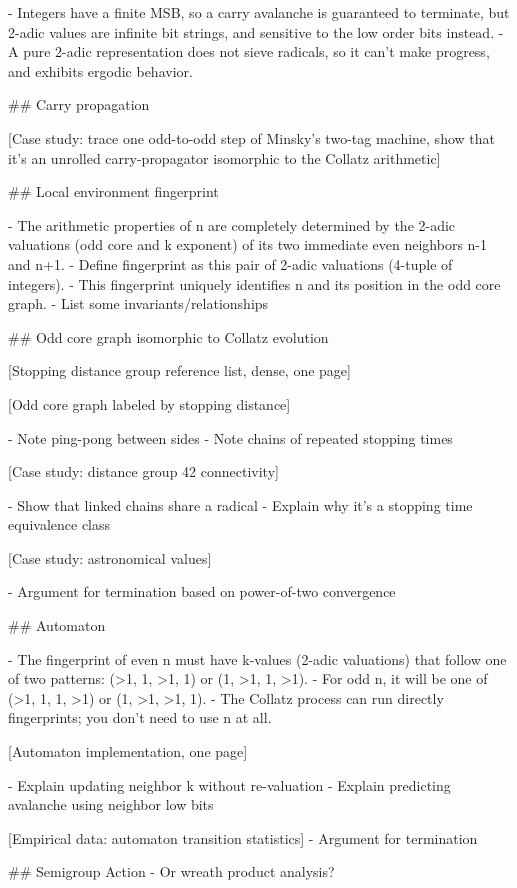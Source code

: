 \documentclass[12pt]{article}
\theoremstyle{plain}
\theoremstyle{definition}
\begin{document}
- Integers have a finite MSB, so a carry avalanche is guaranteed to terminate, but 2-adic values are infinite bit strings, and sensitive to the low order bits instead. 
- A pure 2-adic representation does not sieve radicals, so it can't make progress, and exhibits ergodic behavior.

## Carry propagation

[Case study: trace one odd-to-odd step of Minsky's two-tag machine, show that it's an unrolled carry-propagator isomorphic to the Collatz arithmetic]

## Local environment fingerprint

- The arithmetic properties of n are completely determined by the 2-adic valuations (odd core and k exponent) of its two immediate even neighbors n-1 and n+1.
- Define fingerprint as this pair of 2-adic valuations (4-tuple of integers).
- This fingerprint uniquely identifies n and its position in the odd core graph.
- List some invariants/relationships

## Odd core graph isomorphic to Collatz evolution

[Stopping distance group reference list, dense, one page]

[Odd core graph labeled by stopping distance]

- Note ping-pong between sides
- Note chains of repeated stopping times

[Case study: distance group 42 connectivity]

- Show that linked chains share a radical
- Explain why it's a stopping time equivalence class

[Case study: astronomical values]

- Argument for termination based on power-of-two convergence

## Automaton 

- The fingerprint of even n must have k-values (2-adic valuations) that follow one of two patterns: (>1, 1, >1, 1) or (1, >1, 1, >1).
- For odd n, it will be one of (>1, 1, 1, >1) or (1, >1, >1, 1).
- The Collatz process can run directly fingerprints; you don't need to use n at all.

[Automaton implementation, one page]

- Explain updating neighbor k without re-valuation
- Explain predicting avalanche using neighbor low bits

[Empirical data: automaton transition statistics]
- Argument for termination

## Semigroup Action
- Or wreath product analysis?
\end{document}
